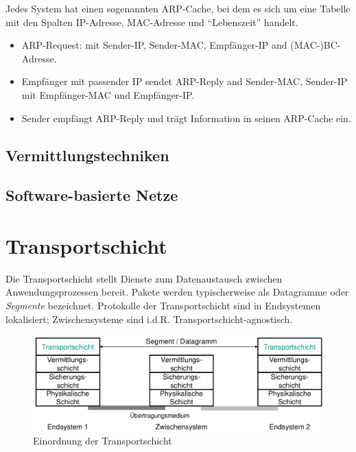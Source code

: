 \documentclass[a4paper, 14pt]{article}
\begin{document}
	Jedes System hat einen sogenannten ARP-Cache, bei dem es sich um eine Tabelle mit den Spalten IP-Adresse, MAC-Adresse und \enquote{Lebenszeit} handelt.

	\begin{itemize}
		\item ARP-Request: mit Sender-IP, Sender-MAC, Empfänger-IP and (MAC-)BC-Adresse.
		\item Empfänger mit passender IP sendet ARP-Reply and Sender-MAC, Sender-IP mit Empfänger-MAC und Empfänger-IP.
		\item Sender empfängt ARP-Reply und trägt Information in seinen ARP-Cache ein.
	\end{itemize}


	\subsection{Vermittlungstechniken}


	\subsection{Software-basierte Netze}


	\section{Transportschicht}

	Die Transportschicht stellt Dienste zum Datenaustausch zwischen Anwendungsprozessen bereit.
	Pakete werden typischerweise als Datagramme oder \emph{Segmente} bezeichnet.
	Protokolle der Transportschicht sind in Endsystemen lokalisiert; Zwischensysteme sind i.d.R. Transportschicht-agnostisch.

	\begin{figure}
		\includegraphics[width=\textwidth]{images/06-transport-layer.png}
		\caption{Einordnung der Transportschicht}
	\end{figure}
\end{document}
